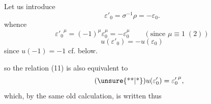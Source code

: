 Let us introduce
\[
\tag{*}
\varepsilon'_0=\sigma^{-1}\rho=-\varepsilon_0.
\]
whence
\[
{\varepsilon'_0}^{\mu}=(-1)^\mu\varepsilon_0^\mu=-\varepsilon_0^\mu
\qquad(\text{since }\mu\equiv1\;(2))
\]
\[
u(\varepsilon'_0)=-u(\varepsilon_0)
\]
since $u(-1)=-1$ cf. below.

so the relation (11) is also equivalent to
\[
\tag{\unsure{**|*}}
u(\varepsilon'_0)={\varepsilon'_0}^{\mu},
\]
which, by the same old calculation, is written thus

